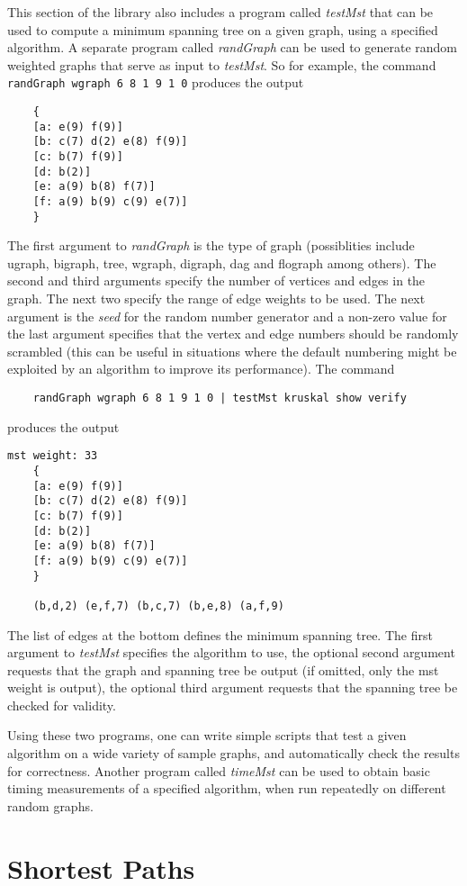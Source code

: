 \documentclass[11pt]{article}
\begin{document}
This section of the library also includes a program called {\sl testMst} that can be used to
compute a minimum spanning tree on a given graph, using a specified algorithm.
A separate program called {\sl randGraph} can be used
to generate random weighted graphs that serve as input to {\sl testMst}. 
So for example, the command
{\tt randGraph wgraph 6 8 1 9 1 0} produces the output
\begin{verbatim}
    {
    [a: e(9) f(9)]
    [b: c(7) d(2) e(8) f(9)]
    [c: b(7) f(9)]
    [d: b(2)]
    [e: a(9) b(8) f(7)]
    [f: a(9) b(9) c(9) e(7)]
    }
\end{verbatim}
The first argument to {\sl randGraph} is the type of graph
(possiblities include ugraph, bigraph, tree, wgraph, digraph, dag and flograph among others).
The second and third arguments specify the number of vertices and edges in the graph.
The next two specify the range of edge weights to be used.
The next argument is the {\sl seed} for the random number generator and a
non-zero value for the last argument specifies that the vertex and edge numbers should be 
randomly scrambled (this can be useful in situations where the default
numbering might be exploited by an algorithm to improve its performance).
The command
\begin{verbatim}
    randGraph wgraph 6 8 1 9 1 0 | testMst kruskal show verify 
\end{verbatim}
produces the output
\newpage
\begin{verbatim}
mst weight: 33
    {
    [a: e(9) f(9)]
    [b: c(7) d(2) e(8) f(9)]
    [c: b(7) f(9)]
    [d: b(2)]
    [e: a(9) b(8) f(7)]
    [f: a(9) b(9) c(9) e(7)]
    }

    (b,d,2) (e,f,7) (b,c,7) (b,e,8) (a,f,9)
\end{verbatim}
The list of edges at the bottom defines the minimum spanning tree.
The first argument to {\sl testMst} specifies the algorithm to use,
the optional second argument requests that the graph and spanning tree be output
(if omitted, only the mst weight is output), the optional third argument requests that
the spanning tree be checked for validity.

Using these two programs, one can write simple scripts that
test a given algorithm on a wide variety of sample graphs, and automatically check the results for
correctness. Another program called {\sl timeMst} can be used to obtain basic timing measurements
of a specified algorithm, when run repeatedly on different random graphs.

\section{Shortest Paths}
\end{document}
